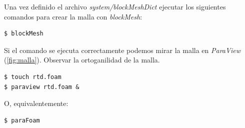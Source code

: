 \documentclass{article}
\begin{document}
\bigskip\bigskip
{}
Una vez definido el archivo \textit{system/blockMeshDict} ejecutar los siguientes comandos para crear la malla con \textit{blockMesh}:
\begin{lstlisting}
$ blockMesh
\end{lstlisting}
\bigskip
Si el comando se ejecuta correctamente podemos mirar la malla en \textit{ParaView} (\ref{fig:malla}). Observar la ortoganilidad de la malla. 

\begin{lstlisting}
$ touch rtd.foam 
$ paraview rtd.foam &
\end{lstlisting}

O, equivalentemente:

\begin{lstlisting}
$ paraFoam 
\end{lstlisting}
\bigskip
{}
\end{document}
